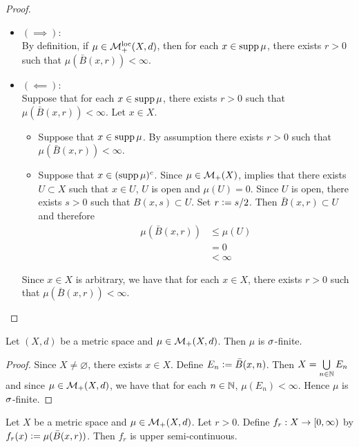 \documentclass{book}
\begin{document}
	\begin{proof}\
		\begin{itemize}
			\item $(\implies):$ \\
			By definition, if $\mu \in \mathcal{M}_+^{\text{loc}}(X, d)$, then for each $x \in \operatorname{supp} \mu$, there exists $r > 0$ such that $\mu(\bar{B}(x, r)) < \infty$. 
			\item $(\impliedby):$ \\
			Suppose that for each $x \in \operatorname{supp} \mu$, there exists $r > 0$ such that $\mu(\bar{B}(x, r)) < \infty$. Let $x \in X$. 
			\begin{itemize}
				\item Suppose that $x \in \operatorname{supp} \mu$. By assumption there exists $r > 0$ such that $\mu(\bar{B}(x, r)) < \infty$. 
				\item Suppose that $x \in (\operatorname{supp} \mu)^c$. Since $\mu \in \mathcal{M}_+(X)$,  implies that there exists $U \subset X$ such that $x \in U$, $U$ is open and $\mu(U) = 0$. Since $U$ is open, there exists $s > 0$ such that $B(x, s) \subset U$. Set $r \vcentcolon= s/2$. Then $\bar{B}(x, r) \subset U$ and therefore 
				\begin{align*}
					\mu(\bar{B}(x, r))
					& \leq \mu (U) \\
					& = 0 \\
					& < \infty 
				\end{align*}
			\end{itemize}
			Since $x \in X$ is arbitrary, we have that for each $x \in X$, there exists $r > 0$ such that $\mu(\bar{B}(x, r)) < \infty$.
		\end{itemize}
	\end{proof}
	
	\begin{ex} 
		Let $(X, d)$ be a metric space and $\mu \in \mathcal{M}_+(X, d)$. Then $\mu$ is $\sigma$-finite. 
	\end{ex}

	\begin{proof}
		Since $X \neq \varnothing$, there exists $x \in X$. Define $E_n \vcentcolon= \bar{B}(x, n)$. Then $X = \bigcup\limits_{n \in \mathbb{N}} E_n$ and since $\mu \in \mathcal{M}_+(X, d)$, we have that for each $n \in \mathbb{N}$, $\mu(E_n) < \infty$. Hence $\mu$ is $\sigma$-finite.
	\end{proof}
	
	\begin{ex} 
		Let $X$ be a metric space and $\mu \in \mathcal{M}_+(X, d)$. Let $r > 0$. Define $f_r: X \rightarrow [0,\infty)$ by $f_r(x) \vcentcolon= \mu(\bar{B}(x, r))$. Then $f_r$ is upper semi-continuous.
	\end{ex}
	
\end{document}
